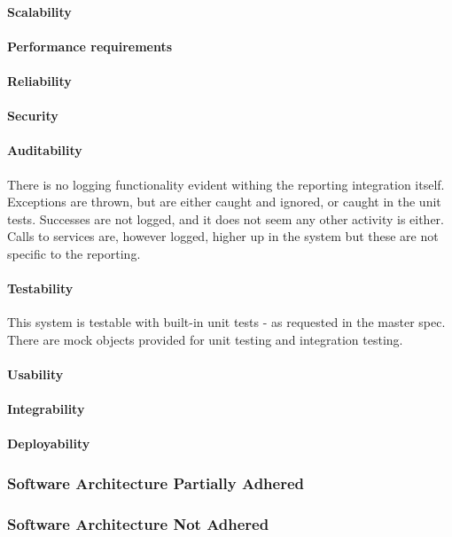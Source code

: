 \documentclass{article}
\begin{document}
            \paragraph{Scalability}
            \paragraph{Performance requirements}
            \paragraph{Reliability}
            \paragraph{Security}
            \paragraph{Auditability}
            There is no logging functionality evident withing the reporting integration itself. Exceptions are thrown, but are either caught and ignored, or caught in the unit tests. Successes are not logged, and it does not seem any other activity is either. Calls to services are, however logged, higher up in the system but these are not specific to the reporting.
            \paragraph{Testability}
            This system is testable with built-in unit tests - as requested in the master spec. There are mock objects provided for unit testing and integration testing.
            \paragraph{Usability}
            \paragraph{Integrability}
            \paragraph{Deployability}
        \subsubsection{Software Architecture Partially Adhered}
        \subsubsection{Software Architecture Not Adhered}       
        
\end{document}

